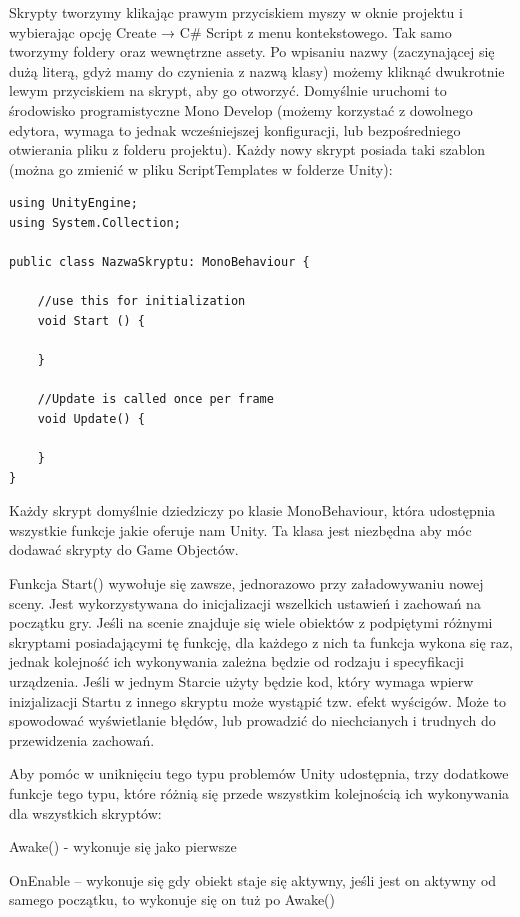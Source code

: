 \documentclass[12pt]{xmgr}
\begin{document}
Skrypty tworzymy klikając prawym przyciskiem myszy w oknie projektu i wybierając opcję  Create    → C\# Script z menu kontekstowego. Tak samo tworzymy foldery oraz wewnętrzne assety. Po wpisaniu nazwy (zaczynającej się dużą literą, gdyż mamy do czynienia z nazwą klasy) możemy kliknąć dwukrotnie lewym przyciskiem na skrypt, aby go otworzyć. Domyślnie uruchomi to środowisko programistyczne Mono Develop (możemy korzystać z dowolnego edytora, wymaga to jednak wcześniejszej konfiguracji, lub bezpośredniego otwierania pliku z folderu projektu). Każdy nowy skrypt posiada taki szablon (można go zmienić w pliku ScriptTemplates w folderze Unity):

\newpage
\begin{lstlisting}
using UnityEngine;
using System.Collection;

public class NazwaSkryptu: MonoBehaviour {

	//use this for initialization
	void Start () {

	}

	//Update is called once per frame
	void Update() {

	}
}
\end{lstlisting}

Każdy skrypt domyślnie dziedziczy po klasie MonoBehaviour, która  udostępnia wszystkie funkcje jakie oferuje nam Unity. Ta klasa jest niezbędna aby móc dodawać skrypty do Game Objectów.

Funkcja Start() wywołuje się zawsze, jednorazowo przy załadowywaniu nowej sceny. Jest wykorzystywana do inicjalizacji wszelkich ustawień i zachowań na początku gry. Jeśli na scenie znajduje się wiele obiektów z podpiętymi różnymi skryptami posiadającymi tę funkcję, dla każdego  z nich ta funkcja wykona się raz, jednak kolejność ich wykonywania zależna będzie od rodzaju i specyfikacji urządzenia. Jeśli w jednym Starcie użyty będzie kod, który wymaga wpierw inizjalizacji Startu z innego skryptu może wystąpić tzw. efekt wyścigów. Może to spowodować wyświetlanie błędów, lub prowadzić do niechcianych i trudnych do przewidzenia zachowań.

Aby pomóc w uniknięciu tego typu problemów Unity udostępnia, trzy dodatkowe funkcje tego typu, które różnią się przede wszystkim kolejnością ich wykonywania dla wszystkich skryptów:

Awake() - wykonuje się jako pierwsze

OnEnable – wykonuje się gdy obiekt staje się aktywny, jeśli jest on aktywny od samego początku, to wykonuje się on tuż po Awake()
\end{document}
